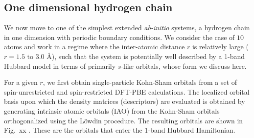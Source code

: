 \subsection{One dimensional hydrogen chain}
We now move to one of the simplest extended \emph{ab-initio} systems, a hydrogen chain in one dimension with periodic boundary conditions. 
We consider the case of $10$ atoms and work in a regime where the inter-atomic distance $r$ is 
relatively large ($r=1.5$ to $3.0$ \AA), such that the system is potentially well described by a 1-band Hubbard model 
in terms of primarily $s$-like orbitals, whose form we discuss here. 


For a given $r$, we first obtain single-particle Kohn-Sham orbitals from a set of spin-unrestricted and 
spin-restricted DFT-PBE calculations. The localized orbital basis upon which the density matrices (descriptors) 
are evaluated is obtained by generating intrinsic atomic orbitals (IAO) from the Kohn-Sham orbitals 
orthogonalized using the L\"owdin procedure. The resulting orbitals are shown in Fig.~xx . These are the orbitals that enter the 1-band Hubbard Hamiltonian. 

